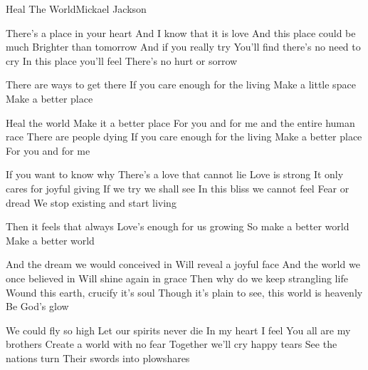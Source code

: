 \documentclass[a4paper,11pt,french]{article}
\begin{document}

\begin{Song}{Heal The World}{Mickael Jackson}
\begin{multicols}{2}
\begin{Verse}
There's a place in your heart
And I know that it is love
And this place could be much
Brighter than tomorrow
And if you really try
You'll find there's no need to cry
In this place you'll feel
There's no hurt or sorrow
\end{Verse}
\espaceInterStrophe

\begin{PreChorus}
There are ways to get there
If you care enough for the living
Make a little space
Make a better place
\end{PreChorus}
\espaceInterStrophe

\begin{Chorus}
Heal the world
Make it a better place
For you and for me and the entire human race
There are people dying
If you care enough for the living
Make a better place
For you and for me
\end{Chorus}
\espaceInterStrophe

\begin{Verse}
If you want to know why
There's a love that cannot lie
Love is strong
It only cares for joyful giving
If we try we shall see
In this bliss we cannot feel
Fear or dread
We stop existing and start living
\end{Verse}
\espaceInterStrophe

\begin{PreChorus}
Then it feels that always
Love's enough for us growing
So make a better world
Make a better world
\end{PreChorus}
\espaceInterStrophe

\tochorus
\vfill
\columnbreak

\begin{Bridge}
And the dream we would conceived in
Will reveal a joyful face
And the world we once believed in
Will shine again in grace
Then why do we keep strangling life
Wound this earth, crucify it's soul
Though it's plain to see, this world is heavenly
Be God's glow
\end{Bridge}
\espaceInterStrophe

\begin{Verse}
We could fly so high
Let our spirits never die
In my heart I feel
You all are my brothers
Create a world with no fear
Together we'll cry happy tears
See the nations turn
Their swords into plowshares
\end{Verse}
\espaceInterStrophe


\end{multicols}
\end{Song}
\end{document}
